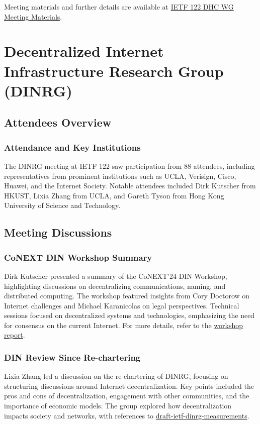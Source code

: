\documentclass{article}
\begin{document}
Meeting materials and further details are available at \href{https://www.ietf.org/proceedings/122/dhc.html}{IETF 122 DHC WG Meeting Materials}.




\newpage

\section{Decentralized Internet Infrastructure Research Group (DINRG)}

\subsection{Attendees Overview}
\subsubsection{Attendance and Key Institutions}
The DINRG meeting at IETF 122 saw participation from 88 attendees, including representatives from prominent institutions such as UCLA, Verisign, Cisco, Huawei, and the Internet Society. Notable attendees included Dirk Kutscher from HKUST, Lixia Zhang from UCLA, and Gareth Tyson from Hong Kong University of Science and Technology.

\subsection{Meeting Discussions}

\subsubsection{CoNEXT DIN Workshop Summary}
Dirk Kutscher presented a summary of the CoNEXT'24 DIN Workshop, highlighting discussions on decentralizing communications, naming, and distributed computing. The workshop featured insights from Cory Doctorow on Internet challenges and Michael Karanicolas on legal perspectives. Technical sessions focused on decentralized systems and technologies, emphasizing the need for consensus on the current Internet. For more details, refer to the \href{https://dirk-kutscher.info/events/conferences-workshops/conext-2024-din-report/}{workshop report}.

\subsubsection{DIN Review Since Re-chartering}
Lixia Zhang led a discussion on the re-chartering of DINRG, focusing on structuring discussions around Internet decentralization. Key points included the pros and cons of decentralization, engagement with other communities, and the importance of economic models. The group explored how decentralization impacts society and networks, with references to \href{https://datatracker.ietf.org/doc/html/draft-ietf-dinrg-measurements}{draft-ietf-dinrg-measurements}.
\end{document}
